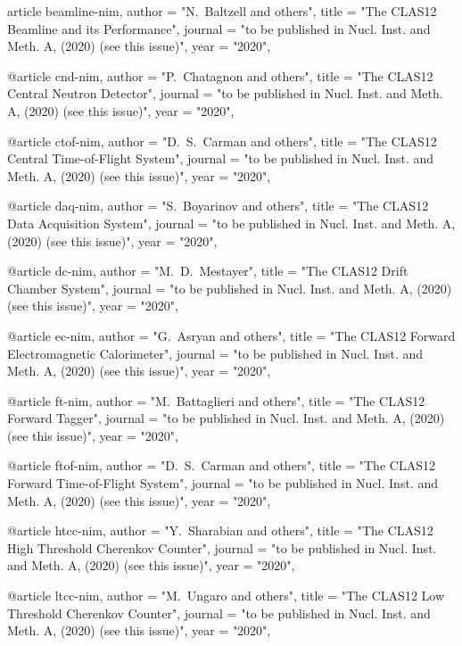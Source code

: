 article{
beamline-nim,
author         = "N.~Baltzell and others",
title          = "{The CLAS12 Beamline and its Performance}",
journal        = "to be published in Nucl. Inst. and Meth. A, (2020) (see this issue)",
year           = "2020",
}

@article{
cnd-nim,
author         = "P.~Chatagnon and others",
title          = "{The CLAS12 Central Neutron Detector}",
journal        = "to be published in Nucl. Inst. and Meth. A, (2020) (see this issue)",
year           = "2020",
}

@article{
ctof-nim,
author         = "D.~S.~Carman and others",
title          = "{The CLAS12 Central Time-of-Flight System}",
journal        = "to be published in Nucl. Inst. and Meth. A, (2020) (see this issue)",
year           = "2020",
}

@article{
daq-nim,
author         = "S.~Boyarinov and others",
title          = "{The CLAS12 Data Acquisition System}",
journal        = "to be published in Nucl. Inst. and Meth. A, (2020) (see this issue)",
year           = "2020",
}

@article{
dc-nim,
author         = "M.~D.~Mestayer",
title          = "{The CLAS12 Drift Chamber System}",
journal        = "to be published in Nucl. Inst. and Meth. A, (2020) (see this issue)",
year           = "2020",
}

@article{
ec-nim,
author         = "G.~Asryan and others",
title          = "{The CLAS12 Forward Electromagnetic Calorimeter}",
journal        = "to be published in Nucl. Inst. and Meth. A, (2020) (see this issue)",
year           = "2020",
}

@article{
ft-nim,
author         = "M.~Battaglieri and others",
title          = "{The CLAS12 Forward Tagger}",
journal        = "to be published in Nucl. Inst. and Meth. A, (2020) (see this issue)",
year           = "2020",
}

@article{
ftof-nim,
author         = "D.~S.~Carman and others",
title          = "{The CLAS12 Forward Time-of-Flight System}",
journal        = "to be published in Nucl. Inst. and Meth. A, (2020) (see this issue)",
year           = "2020",
}

@article{
htcc-nim,
author         = "Y.~Sharabian and others",
title          = "{The CLAS12 High Threshold Cherenkov Counter}",
journal        = "to be published in Nucl. Inst. and Meth. A, (2020) (see this issue)",
year           = "2020",
}

@article{
ltcc-nim,
author         = "M.~Ungaro and others",
title          = "{The CLAS12 Low Threshold Cherenkov Counter}",
journal        = "to be published in Nucl. Inst. and Meth. A, (2020) (see this issue)",
year           = "2020",
}

